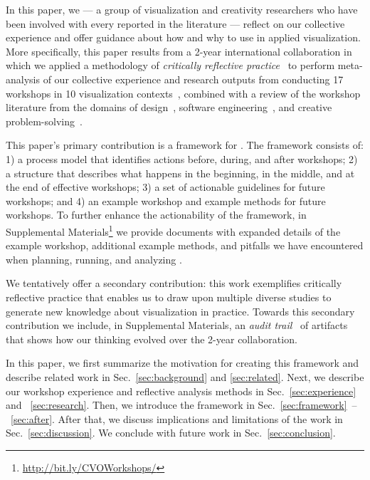 In this paper, we --- a group of visualization and creativity researchers who have been involved with every \workshop reported in the literature --- 
reflect on our collective experience and offer guidance about how and why to use \workshops in applied visualization. More specifically, this paper results from a 2-year international collaboration in which we applied a methodology of \emph{critically reflective practice}~\cite{Brookfield1998} to perform meta-analysis of our collective experience and research outputs from conducting 17 workshops in 10 visualization contexts~\cite{Dykes2010,Goodwin2016,Goodwin2013,Kerzner2017:utdb,Kerzner2017,Lisle2017,Nobre2017,Rogers2016,Rogers2017,Walker2013}, combined with a review of the workshop literature from the domains of design~\cite{Biskjaer2017,Dove2014,Kumar2012,Sanders2010}, software engineering~\cite{Horkoff2015,Jones2008,Jones2005,Jones2007,Maiden2010,Maiden2004,Maiden2005}, and creative problem-solving~\cite{DeBono1983,Gordon1961,Hamilton2016,Miller1989,Osborn1953}. 

This paper's primary contribution is a framework for \workshops. The framework consists of: 1) a process model that identifies actions before, during, and after workshops; 2) a structure that describes what happens in the beginning, in the middle, and at the end of effective workshops; 3) a set of \numberOfGuidelines actionable guidelines for future workshops; and 4) an example workshop and example methods for future workshops. To further enhance the actionability of the framework, in Supplemental Materials\footnote{\href{http://bit.ly/CVOWorkshops}{http://bit.ly/CVOWorkshops/}} we provide documents with expanded details of the example workshop, additional example methods, and \numberOfPitfalls pitfalls we have encountered when planning, running, and analyzing \workshops. 

We tentatively offer a secondary contribution: this work exemplifies critically reflective practice that enables us to draw upon multiple diverse studies to generate new knowledge about visualization in practice. Towards this secondary contribution we include, in Supplemental Materials, an {\it audit trail}~\cite{Carcary2009,Lincoln1985} of artifacts that shows how our thinking evolved over the 2-year collaboration. 

In this paper, we first summarize the motivation for creating this framework and describe related work in Sec.~\ref{sec:background} and \ref{sec:related}. Next, we describe our workshop experience and reflective analysis methods in Sec.~\ref{sec:experience} and ~\ref{sec:research}. Then, we introduce the framework in Sec.~\ref{sec:framework}~--~\ref{sec:after}. After that, we discuss implications and limitations of the work in Sec.~\ref{sec:discussion}. We conclude with future work in Sec.~\ref{sec:conclusion}.